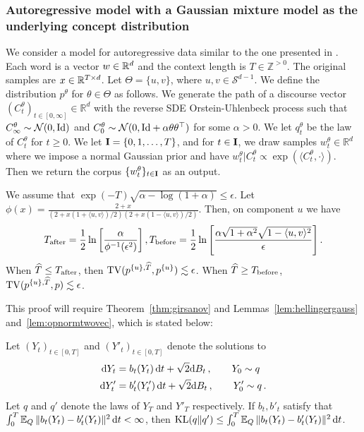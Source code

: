 \subsubsection{Autoregressive model with a Gaussian mixture model as the underlying concept distribution }\label{app:autoregressive_gmm}
We consider a model for autoregressive data similar to the one presented in \citep{arora2019latentvariablemodelapproach}. Each word is a vector $w \in \mathbb{R}^d$ and  the context length is $T \in \mathbb{Z}^{>0}$. The original samples are $x \in \mathbb{R}^{T \times d}$. Let $\Theta = \{u,v\}$, where $u, v \in \mathcal{S}^{d-1}$. We define the distribution $p^\theta$ for $\theta \in \Theta$ as follows. We generate the path of a discourse vector $\left(C_t^\theta\right)_{t \in [0,\infty]} \in \mathbb{R}^d$ with the reverse SDE Orstein-Uhlenbeck process such that $C_\infty^\theta \sim \mathcal{N}(0,\mathrm{Id})$ and $C_0^\theta \sim \mathcal{N}(0, \mathrm{Id} + \alpha \theta \theta ^\top)$ for some $\alpha > 0$. We let $q^\theta_t$ be the law of $C^\theta_t$ for $t \geq 0$. We let $\mathbf{I}=\{0,1,\dots,T\}$, and for $t \in \mathbf{I}$, we draw samples $w^\theta_t \in \mathbb{R}^d$ where we impose a normal Gaussian prior and have $w^\theta_t|C_t^\theta \propto \exp(\langle C_t^\theta, \cdot \rangle )$. Then we return the corpus $\{w^\theta_t\}_{t \in \mathbf{I}}$ as an output. 
\begin{theorem}\label{example:ar_mixture}



We assume that $\exp(-T) \sqrt{\alpha-\log(1+\alpha)} \leq \epsilon$. Let $\phi(x)=\frac{2+x}{(2+x (1+\langle u,v\rangle)/2)(2+x (1-\langle u,v\rangle)/2)}$. Then, on component $u$ we have 
\begin{align}
T_{\mathrm{after}} = \frac{1}{2} \ln\left[\frac{\alpha}{\phi^{-1}(\epsilon^2)}\right], T_{\mathrm{before}} =\frac{1}{2}\ln\left[\frac{\alpha\sqrt{1+\alpha^2} \sqrt{1-\langle u,v\rangle^2}}{\epsilon}\right]. 
\end{align}
When $\widehat{T} \leq T_{\mathrm{after}}$, then $\TV(\modrevlaw{\{u\}}{\wh{T}}{},p^{\{u\}}) \lesssim \epsilon$. When $\widehat{T} \geq T_{\mathrm{before}}$, $\TV(\modrevlaw{\{u\}}{\wh{T}}{},p)\lesssim \epsilon$. 
\end{theorem}

\noindent This proof will require Theorem~\ref{thm:girsanov} and Lemmas~\ref{lem:hellingergauss} and~\ref{lem:opnormtwovec}, which is stated below:
\begin{theorem}\label{thm:girsanov}
    Let $(Y_t)_{t\in[0,T]}$ and $(Y'_t)_{t\in[0,T]}$ denote the solutions to
    \begin{align*}
        \mathrm{d} Y_t &= b_t(Y_t) \, \mathrm{d} t + \sqrt{2}\mathrm{d} B_t\,, \qquad Y_0 \sim q \\
        \mathrm{d} Y'_t &= b'_t(Y'_t)\, \mathrm{d} t + \sqrt{2}\mathrm{d} B_t\,, \qquad Y'_0 \sim q\,.
    \end{align*}
    Let $q$ and $q'$ denote the laws of $Y_T$ and $Y'_T$ respectively. If $b_t, b'_t$ satisfy that $\int^T_0 \mathbb{E}_Q\,\|b_t(Y_t) - b'_t(Y_t)\|^2\, \mathrm{d} t < \infty$, then $\mathrm{KL}(q\|q') \le \int^T_0 \mathbb{E}_Q\,\|b_t(Y_t) - b'_t(Y_t)\|^2\,\mathrm{d} t$.
\end{theorem}


